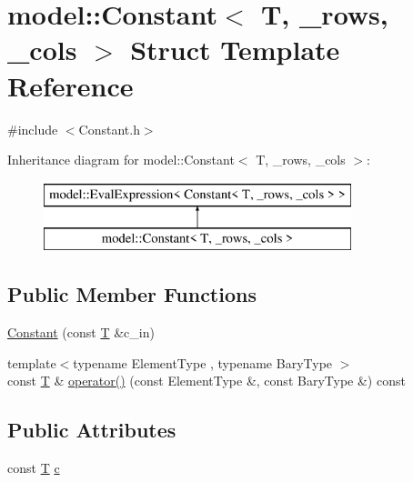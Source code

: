 \hypertarget{structmodel_1_1_constant}{}\section{model\+:\+:Constant$<$ T, \+\_\+rows, \+\_\+cols $>$ Struct Template Reference}
\label{structmodel_1_1_constant}


{\ttfamily \#include $<$Constant.\+h$>$}

Inheritance diagram for model\+:\+:Constant$<$ T, \+\_\+rows, \+\_\+cols $>$\+:\begin{figure}[H]
\begin{center}
\leavevmode
\includegraphics[height=2.000000cm]{structmodel_1_1_constant}
\end{center}
\end{figure}
\subsection*{Public Member Functions}
\begin{DoxyCompactItemize}
\item 
\hyperlink{structmodel_1_1_constant_af664ddb47b2c0d9616426a8e18f346c0}{Constant} (const \hyperlink{_spline_node_base__corder1_8h_a82692d3a5502b91460591f1d5504314a}{T} \&c\+\_\+in)
\item 
{\footnotesize template$<$typename Element\+Type , typename Bary\+Type $>$ }\\const \hyperlink{_spline_node_base__corder1_8h_a82692d3a5502b91460591f1d5504314a}{T} \& \hyperlink{structmodel_1_1_constant_a2c2dbafc22fd2bd519ba83d8da4f9ff0}{operator()} (const Element\+Type \&, const Bary\+Type \&) const 
\end{DoxyCompactItemize}
\subsection*{Public Attributes}
\begin{DoxyCompactItemize}
\item 
const \hyperlink{_spline_node_base__corder1_8h_a82692d3a5502b91460591f1d5504314a}{T} \hyperlink{structmodel_1_1_constant_a209b0aade26ba5f7152f102190b5eb13}{c}
\end{DoxyCompactItemize}
